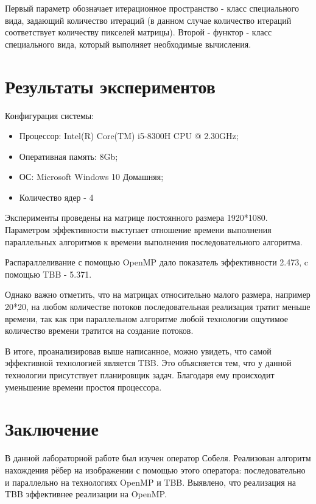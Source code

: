 \documentclass[12pt]{article}
\begin{document}
Первый параметр обозначает итерационное пространство - класс специального вида, задающий количество итераций (в данном случае количество итераций соответствует количеству пикселей матрицы). Второй - функтор - класс специального вида, который выполняет необходимые вычисления.
\newpage

\section*{Результаты экспериментов}

Конфигурация системы:
\begin{itemize}
\item Процессор: Intel(R) Core(TM) i5-8300H CPU @ 2.30GHz;
\item Оперативная память: 8Gb;
\item ОС: Microsoft Windows 10 Домашняя;
\item Количество ядер - 4
\end{itemize}

Эксперименты проведены на матрице постоянного размера 1920*1080. Параметром эффективности выступает отношение времени выполнения параллельных алгоритмов к времени выполнения последовательного алгоритма. 

Распараллеливание с помощью OpenMP дало показатель эффективности 2.473, c помощью TBB - 5.371.

Однако важно отметить, что на матрицах относительно малого размера, например 20*20, на любом количестве потоков последовательная реализация тратит меньше времени, так как при параллельном алгоритме любой технологии ощутимое количество времени тратится на создание потоков.

В итоге, проанализировав выше написанное, можно увидеть, что самой эффективной технологией является TBB. Это объясняется тем, что у данной технологии присутствует планировщик задач. Благодаря ему происходит уменьшение времени простоя процессора.

\newpage
\section*{Заключение}

В данной лабораторной работе был изучен оператор Собеля. Реализован алгоритм нахождения рёбер на изображении с помощью этого оператора: последовательно и параллельно на технологиях OpenMP и TBB. Выявлено, что реализация на TBB эффективнее реализации на OpenMP.
\end{document}
